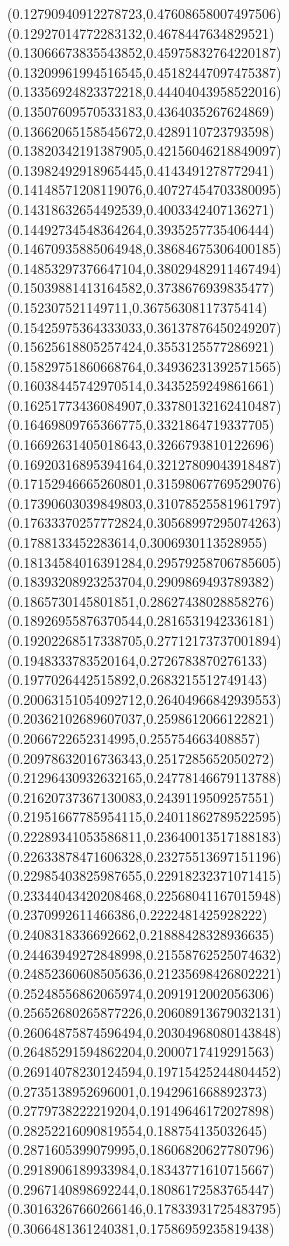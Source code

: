 {(0.12790940912278723,0.47608658007497506)
(0.12927014772283132,0.4678447634829521)
(0.13066673835543852,0.45975832764220187)
(0.13209961994516545,0.45182447097475387)
(0.13356924823372218,0.44404043958522016)
(0.13507609570533183,0.4364035267624869)
(0.13662065158545672,0.4289110723793598)
(0.13820342191387905,0.42156046218849097)
(0.13982492918965445,0.4143491278772941)
(0.14148571208119076,0.40727454703380095)
(0.14318632654492539,0.4003342407136271)
(0.14492734548364264,0.3935257735406444)
(0.14670935885064948,0.38684675306400185)
(0.14853297376647104,0.38029482911467494)
(0.15039881413164582,0.3738676939835477)
(0.152307521149711,0.36756308117375414)
(0.15425975364333033,0.36137876450249207)
(0.15625618805257424,0.3553125577286921)
(0.15829751860668764,0.34936231392571565)
(0.16038445742970514,0.3435259249861661)
(0.16251773436084907,0.33780132162410487)
(0.16469809765366775,0.3321864719337705)
(0.16692631405018643,0.3266793810122696)
(0.16920316895394164,0.32127809043918487)
(0.17152946665260801,0.31598067769529076)
(0.17390603039849803,0.31078525581961797)
(0.17633370257772824,0.30568997295074263)
(0.1788133452283614,0.3006930113528955)
(0.18134584016391284,0.29579258706785605)
(0.18393208923253704,0.2909869493789382)
(0.1865730145801851,0.28627438028858276)
(0.18926955876370544,0.2816531942336181)
(0.19202268517338705,0.27712173737001894)
(0.1948333783520164,0.2726783870276133)
(0.1977026442515892,0.2683215512749143)
(0.20063151054092712,0.26404966842939553)
(0.20362102689607037,0.2598612066122821)
(0.2066722652314995,0.255754663408857)
(0.20978632016736343,0.2517285652050272)
(0.21296430932632165,0.24778146679113788)
(0.21620737367130083,0.2439119509257551)
(0.21951667785954115,0.24011862789522595)
(0.22289341053586811,0.23640013517188183)
(0.22633878471606328,0.23275513697151196)
(0.22985403825987655,0.22918232371071415)
(0.23344043420208468,0.22568041167015948)
(0.2370992611466386,0.2222481425928222)
(0.2408318336692662,0.21888428328936635)
(0.24463949272848998,0.21558762525074632)
(0.24852360608505636,0.21235698426802221)
(0.25248556862065974,0.2091912002056306)
(0.25652680265877226,0.20608913679032131)
(0.26064875874596494,0.20304968080143848)
(0.26485291594862204,0.2000717419291563)
(0.26914078230124594,0.19715425244804452)
(0.2735138952696001,0.1942961668892373)
(0.2779738222219204,0.19149646172027898)
(0.28252216090819554,0.188754135032645)
(0.2871605399079995,0.18606820627780796)
(0.2918906189933984,0.18343771610715667)
(0.2967140898692244,0.18086172583765447)
(0.30163267660266146,0.17833931725483795)
(0.3066481361240381,0.17586959235819438)
}
